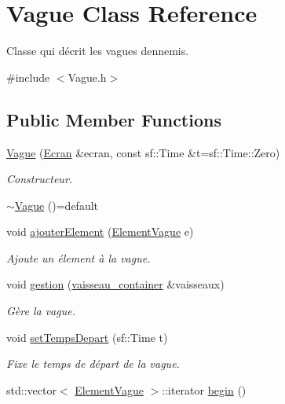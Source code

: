 \hypertarget{class_vague}{}\section{Vague Class Reference}
\label{class_vague}


Classe qui décrit les vagues d\textquotesingle{}ennemis.  




{\ttfamily \#include $<$Vague.\+h$>$}

\subsection*{Public Member Functions}
\begin{DoxyCompactItemize}
\item 
\mbox{\hyperlink{class_vague_ab897ad06f808c1242c26ea10d27026b3}{Vague}} (\mbox{\hyperlink{class_ecran}{Ecran}} \&ecran, const sf\+::\+Time \&t=sf\+::\+Time\+::\+Zero)
\begin{DoxyCompactList}\small\item\em Constructeur. \end{DoxyCompactList}\item 
\mbox{\hyperlink{class_vague_a243a41e1ad5870f7953915ba1984d24a}{$\sim$\+Vague}} ()=default
\item 
void \mbox{\hyperlink{class_vague_a383252153f2cff89c523db5cf4119811}{ajouter\+Element}} (\mbox{\hyperlink{struct_element_vague}{Element\+Vague}} e)
\begin{DoxyCompactList}\small\item\em Ajoute un élement à la vague. \end{DoxyCompactList}\item 
void \mbox{\hyperlink{class_vague_ae544359836d36fb2d49c26af9bd7ff30}{gestion}} (\mbox{\hyperlink{def__type_8h_ad123ed7c93f42c8dd68e4af28b16b639}{vaisseau\+\_\+container}} \&vaisseaux)
\begin{DoxyCompactList}\small\item\em Gère la vague. \end{DoxyCompactList}\item 
void \mbox{\hyperlink{class_vague_a9162962646b70286b2710391c33bcc88}{set\+Temps\+Depart}} (sf\+::\+Time t)
\begin{DoxyCompactList}\small\item\em Fixe le temps de départ de la vague. \end{DoxyCompactList}\item 
std\+::vector$<$ \mbox{\hyperlink{struct_element_vague}{Element\+Vague}} $>$\+::iterator \mbox{\hyperlink{class_vague_a5dd13e05eebd63b4b40557867f47bfd0}{begin}} ()

\end{DoxyCompactItemize}
